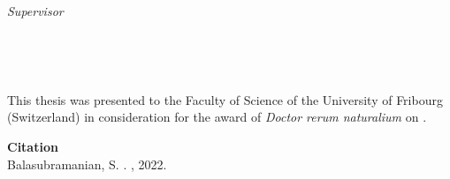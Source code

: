\begin{titlepage}
	\begin{minipage}[t]{.27\textwidth}
		\raggedleft
		\textit{Supervisor}
	\end{minipage}
	\hspace*{15pt}
	\begin{minipage}[t]{.65\textwidth}
		{\Large \thesisFirstSupervisor} \\
	\end{minipage} \\[10mm]


\end{titlepage}



This thesis was presented to the Faculty of Science of the University of Fribourg (Switzerland) in consideration
for the award of \textit{Doctor rerum naturalium} on \thesisDate.

\vfill
{\large \textbf{Citation} \\}
Balasubramanian, S. \thesisTitle . \thesisUniversityGroup, 2022.

